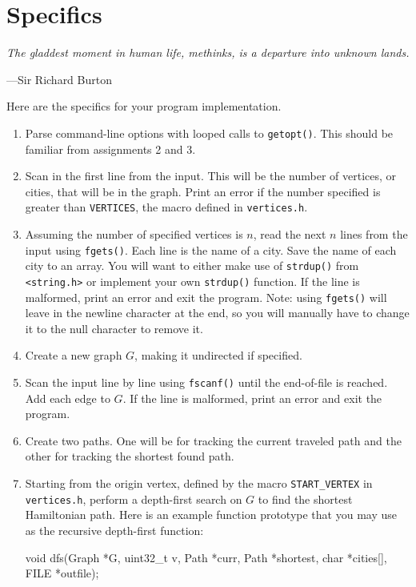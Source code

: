 \section{Specifics}

\textwidth
\epigraph{\emph{The gladdest moment in
human life, methinks, is a departure into unknown lands.}}{---Sir
Richard Burton}

\noindent
Here are the specifics for your program implementation.

\begin{enumerate}
  \item Parse command-line options with looped calls to
    \texttt{getopt()}. This should be familiar from assignments 2 and 3.
  \item Scan in the first line from the input. This will be the
    number of vertices, or cities, that will be in the graph. Print an
    error if the number specified is greater than \texttt{VERTICES}, the
    macro defined in \texttt{vertices.h}.
  \item Assuming the number of specified vertices is $n$, read the next
    $n$ lines from the input using \texttt{fgets()}. Each line is the
    name of a city. Save the name of each city to an array. You will
    want to either make use of \texttt{strdup()} from
    \texttt{<string.h>} or implement your own \texttt{strdup()}
    function. If the line is malformed, print an error
    and exit the program. Note: using \texttt{fgets()} will leave in the
    newline character at the end, so you will manually have to change it
    to the null character to remove it.
  \item Create a new graph $G$, making it undirected if specified.
  \item Scan the input line by line using \texttt{fscanf()} until the
    end-of-file is reached.  Add each edge to $G$. If the line is
    malformed, print an error and exit the program.
  \item Create two paths. One will be for tracking the current traveled path and
    the other for tracking the shortest found path.
  \item Starting from the origin vertex, defined by the macro
    \texttt{START\_VERTEX} in \texttt{vertices.h}, perform a depth-first
    search on $G$ to find the shortest Hamiltonian path. Here is an
    example function prototype that you may use as the recursive
    depth-first function:

\begin{clisting}{}
void dfs(Graph *G, uint32_t v, Path *curr, Path *shortest, char *cities[], FILE *outfile);
\end{clisting}


\end{enumerate}

